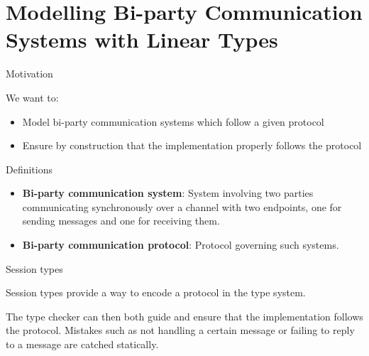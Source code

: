 \documentclass[ignorenonframetext,]{beamer}
\providecommand{\tightlist}{%
  \setlength{\itemsep}{0pt}\setlength{\parskip}{0pt}}
\begin{document}
\hypertarget{modelling-bi-party-communication-systems-with-linear-types}{%
\section{Modelling Bi-party Communication Systems with Linear
Types}\label{modelling-bi-party-communication-systems-with-linear-types}}

\begin{frame}{%
\protect\hypertarget{motivation-2}{%
Motivation}}

We want to:

\begin{itemize}
\tightlist
\item
  Model bi-party communication systems which follow a given protocol
\item
  Ensure by construction that the implementation properly follows the
  protocol
\end{itemize}

\end{frame}

\begin{frame}{%
\protect\hypertarget{definitions-1}{%
Definitions}}

\begin{itemize}
\tightlist
\item
  \textbf{Bi-party communication system}: System involving two parties
  communicating synchronously over a channel with two endpoints, one for
  sending messages and one for receiving them.
\item
  \textbf{Bi-party communication protocol}: Protocol governing such
  systems.
\end{itemize}

\end{frame}

\begin{frame}{%
\protect\hypertarget{session-types}{%
Session types}}

Session types
\cite{Honda:1998:LPT:645392.651876, Wadler:2012:PS:2364527.2364568}
provide a way to encode a protocol in the type system.

The type checker can then both guide and ensure that the implementation
follows the protocol. Mistakes such as not handling a certain message or
failing to reply to a message are catched statically.

\end{frame}
\end{document}
